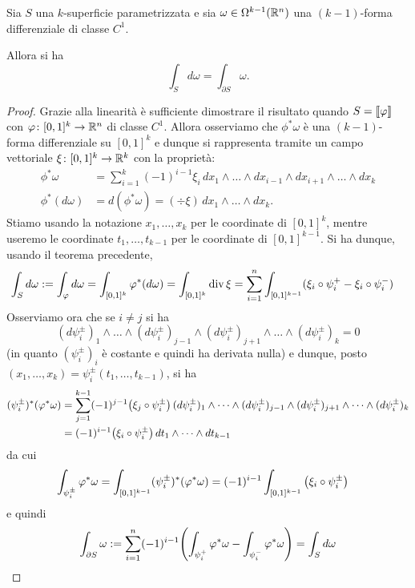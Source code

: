 \begin{theorem}
  \label{th:stokes}
  Sia $S$ una $k$-superficie parametrizzata 
  e sia $\omega\in \Omega^{k-1}({\mathbb R}^n)$ una $(k-1)$-forma differenziale di classe $C^1$.
  
  Allora si ha 
  \[
     \int_S d\omega = \int_{\partial S} \omega.
  \]
\end{theorem}
\begin{proof}
  Grazie alla linearità è sufficiente dimostrare il risultato quando $S={\left\llbracket \varphi \right\rrbracket}$ con 
  $\varphi\colon [0,1]^k \to {\mathbb R}^n$ di classe $C^1$.
  Allora osserviamo che $\phi^* \omega$ è una $(k-1)$-forma differenziale su $[0,1]^k$ 
  e dunque si rappresenta tramite un campo vettoriale $\xi\colon [0,1]^k \to {\mathbb R}^k$ 
  con la proprietà:
  \begin{align*} 
    \phi^* \omega &= \sum_{i=1}^k (-1)^{i-1}\xi_i\, dx_1 \wedge \dots \wedge dx_{i-1} \wedge dx_{i+1} \wedge \dots \wedge dx_k\\
    \phi^* (d\omega) &= d(\phi^* \omega) = (\div \xi)\, dx_1 \wedge \dots \wedge dx_k.
  \end{align*} 
  Stiamo usando la notazione $x_1,\dots,x_k$ per le coordinate di $[0,1]^k$, 
  mentre useremo le coordinate $t_1,\dots, t_{k-1}$ per le coordinate di $[0,1]^{k-1}$.
  Si ha dunque, usando il teorema precedente,
  \begin{align*}
    \int_S d\omega 
    &:= \int_\varphi d\omega 
    = \int_{[0,1]^k} \varphi^* (d\omega)
    = \int_{[0,1]^k} \operatorname{div} \xi 
    = \sum_{i=1}^n \int_{[0,1]^{k-1}} (\xi_i \circ \psi_i^+ - \xi_i \circ \psi_i^-)
  \end{align*}
  Osserviamo ora che se $i\neq j$ si ha 
  \[
  (d\psi_i^\pm)_1 \wedge \dots \wedge (d\psi_i^\pm)_{j-1} \wedge (d\psi_i^\pm)_{j+1} \wedge \dots \wedge (d\psi_i^\pm)_{k} 
  = 0
  \]
  (in quanto $(\psi_i^\pm)_i$ è costante e quindi ha derivata nulla) 
  e dunque, posto $(x_1,\dots, x_k) = \psi_i^\pm(t_1,\dots,t_{k-1})$,
  si ha
  \begin{align*}
    (\psi_i^\pm)^* (\varphi^* \omega)
    &= \sum_{j=1}^{k-1} (-1)^{j-1}{\left( \xi_j \circ \psi_i^\pm \right)}\, (d\psi_i^\pm)_1 \wedge \dots \wedge (d\psi_i^\pm)_{j-1} \wedge (d\psi_i^\pm)_{j+1} \wedge \dots \wedge (d\psi_i^\pm)_{k}\\
    &= (-1)^{i-1} {\left( \xi_i \circ \psi_i^\pm \right)}\, dt_1 \wedge \dots \wedge dt_{k-1}
  \end{align*}
  da cui
  \begin{align*}
    \int_{\psi_i^\pm} \varphi^*\omega 
    &= \int_{[0,1]^{k-1}} (\psi_i^\pm)^* (\varphi^* \omega)
    = (-1)^{i-1} \int_{[0,1]^{k-1}} {\left( \xi_i \circ \psi_i^\pm \right)}
  \end{align*}
  e quindi
  \[
    \int_{\partial S} \omega
    := \sum_{i=1}^n (-1)^{i-1}{\left( \int_{\psi_i^+} \varphi^*\omega - \int_{\psi_i^-} \varphi^*\omega \right)}
    = \int_S d\omega 
  \]
\end{proof}


